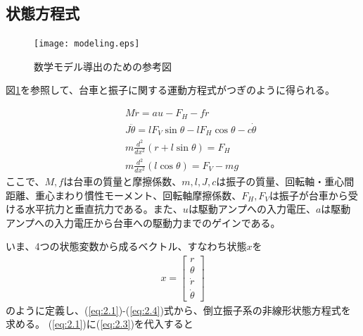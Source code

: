 \documentclass[a4j,11pt,twoside]{ujbook}
\begin{document}
		\subsection{状態方程式}
			\begin{figure}[htbp]
				\begin{center}
					\texttt{[image: modeling.eps]}
					\caption{数学モデル導出のための参考図}
					\label{fig:数式モデル導出のための参考図}
				\end{center}
			\end{figure}

			図\ref{fig:数式モデル導出のための参考図}を参照して、台車と振子に関する運動方程式がつぎのように得られる。

			\begin{eqnarray}
			&&M \ddot{r} = au - F_H - f \dot{r}
			\label{eq:2.1}\\
			&&J \ddot{\theta} = lF_V\sin{\theta} - lF_H\cos{\theta} - c\dot{\theta}
			\label{eq:2.2}\\
			&&m \frac{d^2}{dx^2} (r + l\sin{\theta})  =  F_H
			\label{eq:2.3}\\
			&&m \frac{d^2}{dx^2} (l\cos{\theta})  =  F_V - mg
			\label{eq:2.4}
			\end{eqnarray}
			ここで、$M,f$は台車の質量と摩擦係数、$m,l,J,c$は振子の質量、回転軸・重心間距離、重心まわり慣性モーメント、回転軸摩擦係数、$F_H,F_V$は振子が台車から受ける水平抗力と垂直抗力である。また、$u$は駆動アンプへの入力電圧、$a$は駆動アンプへの入力電圧から台車への駆動力までのゲインである。

			いま、4つの状態変数から成るベクトル、すなわち状態$x$を
			\begin{eqnarray*}
				x=\left[
				\begin{array}{c}
					r\\
					\theta\\
					\dot{r}\\
					\dot{\theta}
				\end{array}
				\right]
			\end{eqnarray*}
			のように定義し、(\ref{eq:2.1})-(\ref{eq:2.4})式から、倒立振子系の非線形状態方程式を求める。
			(\ref{eq:2.1})に(\ref{eq:2.3})を代入すると
\end{document}
